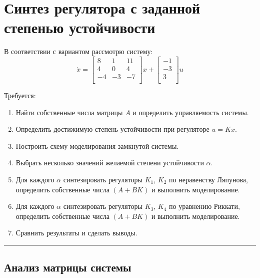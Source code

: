 \documentclass[a4paper,12pt]{article}
\begin{document}
	\newpage
	\tableofcontents
	
	\newpage \section{Синтез регулятора с заданной степенью устойчивости}\label{sec:1}
	
	В соответствии с вариантом рассмотрю систему:
	\[
	\dot x = \begin{bmatrix}
		8 & 1 & 11 \\
		4 & 0 & 4 \\
		-4 & -3 & -7 \\
	\end{bmatrix} x + \begin{bmatrix}
	-1 \\ -3 \\ 3 \\
	\end{bmatrix} u
	\]
	
	Требуется:
	\begin{enumerate}
		\item Найти собственные числа матрицы $A$ и определить управляемость системы.
		
		\item Определить достижимую степень устойчивости при регуляторе $u = Kx$.
		
		\item Построить схему моделирования замкнутой системы.
		
		\item Выбрать несколько значений желаемой степени устойчивости $\alpha$.
		
		\item Для каждого $\alpha$ синтезировать регуляторы $K_1$, $K_2$ по неравенству Ляпунова, определить собственные числа $(A+BK)$ и выполнить моделирование.
		
		\item Для каждого $\alpha$ синтезировать регуляторы $K_3$, $K_4$ по уравнению Риккати, определить собственные числа $(A+BK)$ и выполнить моделирование.
		
		\item Сравнить результаты и сделать выводы.
	\end{enumerate}
	
	\hrule \newpage
	
	\subsection{Анализ матрицы системы}
	
\end{document}
